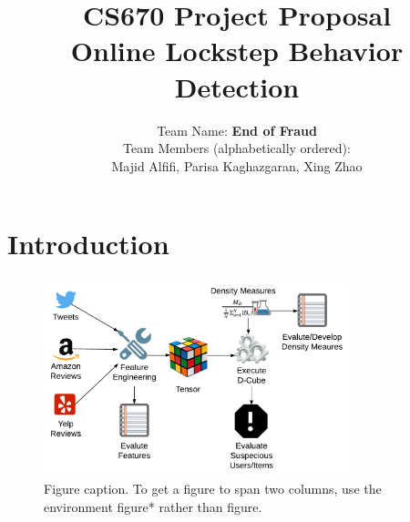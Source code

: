 \documentclass[10pt,twocolumn]{article}
\begin{document}
\title{CS670 Project Proposal\\Online Lockstep Behavior Detection}

\author{
Team Name: \textbf{End of Fraud}\\[2ex]
Team Members \small{(alphabetically ordered)}:\\[1ex]
Majid Alfifi, Parisa Kaghazgaran,  Xing Zhao
}

\maketitle

%

\section{Introduction}
 

\begin{figure}[!b]
  \begin{center}
    \includegraphics[width=3.5in]{figure.pdf}
  \end{center}
  \caption{\small Figure caption. To get a figure to span two
      columns, use the environment figure* rather than figure.}
  \label{fig:process}

\end{figure}
\end{document}

